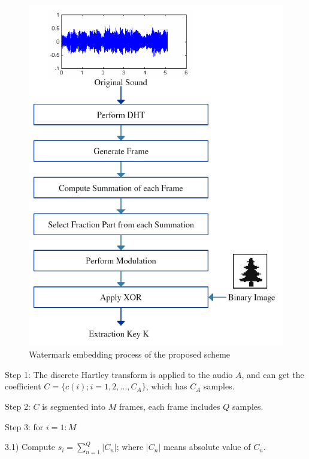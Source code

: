 \documentclass[12pt,a4paper]{report}
\begin{document}
\begin{figure}[h!]
\centering
\includegraphics[scale=.7]{image/Embedding.png}
\caption{Watermark embedding process of the proposed scheme}
\label{fig:embedding}
\end{figure}

\bigskip

Step 1:
The discrete Hartley transform is applied to the audio $ A $, and can get the coefficient $ C = \lbrace c(i); i = 1,2,...,C_{A} \rbrace $, which has $C_{A}$ samples.

\bigskip

Step 2:
$ C $ is segmented into $ M $ frames, each frame includes $Q$ samples.

\bigskip

Step 3:
for $i=1:M$

\bigskip

\hspace{10mm}3.1) Compute $s_{i}=\sum_{n=1}^{Q} |C_{n}|$; where $|C_{n}|$ means absolute value of $C_{n}$.
\end{document}
